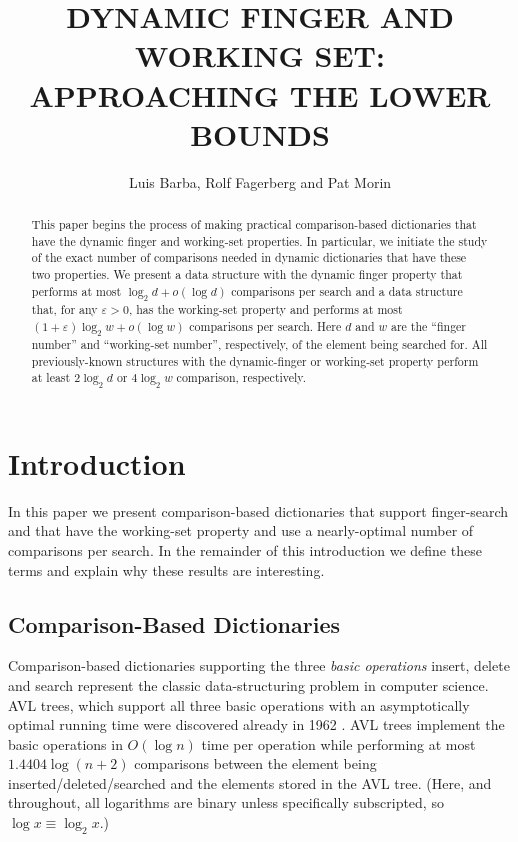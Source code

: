 \documentclass{patmorin}
\title{\MakeUppercase{Dynamic Finger and Working Set: Approaching the Lower Bounds}}
\author{Luis Barba, Rolf Fagerberg and Pat Morin}
\newcommand{\eps}{\varepsilon}
\begin{document}
\begin{titlepage}
\maketitle

\begin{abstract}
  This paper begins the process of making practical comparison-based
  dictionaries that have the dynamic finger and working-set properties.
  In particular, we initiate the study of the exact number of comparisons
  needed in dynamic dictionaries that have these two properties.
  We present a data structure with the dynamic finger property that
  performs at most $\log_2 d+o(\log d)$ comparisons per search and a data
  structure that, for any $\eps > 0$, has the working-set property and
  performs at most $(1+\eps)\log_2 w+o(\log w)$ comparisons per search.
  Here $d$ and $w$ are the ``finger number'' and ``working-set number'',
  respectively, of the element being searched for.  All previously-known
  structures with the dynamic-finger or working-set property perform at
  least $2\log_2 d$ or $4\log_2 w$ comparison, respectively.
\end{abstract}

\end{titlepage}

\section{Introduction}

In this paper we present comparison-based dictionaries that support
finger-search and that have the working-set property and use a
nearly-optimal number of comparisons per search.  In the remainder of
this introduction we define these terms and explain why these results
are interesting.

\subsection{Comparison-Based Dictionaries}

Comparison-based dictionaries supporting the three \emph{basic operations}
insert, delete and search represent the
classic data-structuring problem in computer science.  AVL trees, which
support all three basic operations with an asymptotically optimal running
time were discovered already in 1962 \cite{adelsson.vleski.ea:blah}.
AVL trees implement the basic operations in $O(\log n)$ time per operation
while performing at most $1.4404\log(n+2)$ comparisons between the element
being inserted/deleted/searched and the elements stored in the AVL tree.
(Here, and throughout, all logarithms are binary unless specifically
subscripted, so $\log x \equiv \log_2 x$.)
\end{document}
